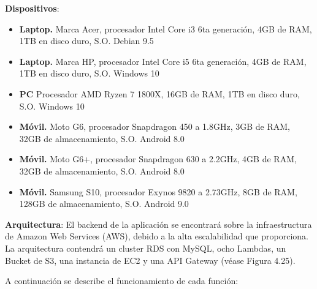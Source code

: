 	\noindent
\textbf{Dispositivos}:
\begin{itemize}
	\item \textbf{Laptop.} Marca Acer, procesador Intel Core i3 6ta generación, 4GB de RAM, 1TB en disco duro, S.O. Debian 9.5
	\item \textbf{Laptop.} Marca HP, procesador Intel Core i5 6ta generación, 4GB de RAM, 1TB en disco duro, S.O. Windows 10
	\item \textbf{PC} Procesador AMD Ryzen 7 1800X, 16GB de RAM, 1TB en disco duro, S.O. Windows 10
	\item \textbf{Móvil.} Moto G6, procesador Snapdragon 450 a 1.8GHz, 3GB de RAM, 32GB de almacenamiento, S.O. Android 8.0
	\item \textbf{Móvil.} Moto G6+, procesador Snapdragon 630 a 2.2GHz, 4GB de RAM, 32GB de almacenamiento, S.O. Android 8.0	
	\item \textbf{Móvil.} Samsung S10, procesador Exynos 9820 a 2.73GHz, 8GB de RAM, 128GB de almacenamiento, S.O. Android 9.0
\end{itemize}
\noindent
\textbf{Arquitectura}:
El backend de la aplicación se encontrará sobre la infraestructura de Amazon Web Services (AWS), debido a la alta escalabilidad que proporciona. La arquitectura contendrá un cluster RDS con MySQL, ocho Lambdas, un Bucket de S3, una instancia de EC2 y una API Gateway (véase Figura 4.25).\par
A continuación se describe el funcionamiento de cada función:\par
